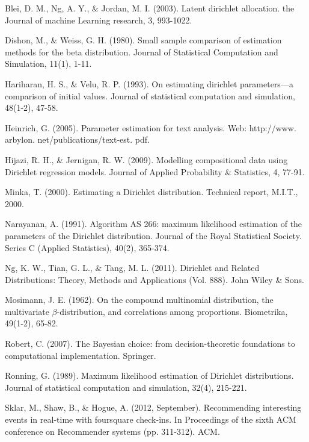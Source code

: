\documentclass[twoside]{article}
\begin{document}
\begin{thebibliography}{20}

Blei, D. M., Ng, A. Y., \& Jordan, M. I. (2003). Latent dirichlet allocation. the Journal of machine Learning research, 3, 993-1022.

Dishon, M., \& Weiss, G. H. (1980). Small sample comparison of estimation methods for the beta distribution. Journal of Statistical Computation and Simulation, 11(1), 1-11.

Hariharan, H. S., \& Velu, R. P. (1993). On estimating dirichlet parameters—a comparison of initial values. Journal of statistical computation and simulation, 48(1-2), 47-58.

Heinrich, G. (2005). Parameter estimation for text analysis. Web: http://www. arbylon. net/publications/text-est. pdf.

Hijazi, R. H., \& Jernigan, R. W. (2009). Modelling compositional data using Dirichlet regression models. Journal of Applied Probability \& Statistics, 4, 77-91.

Minka, T. (2000). Estimating a Dirichlet distribution. Technical report, M.I.T., 2000.

Narayanan, A. (1991). Algorithm AS 266: maximum likelihood estimation of the parameters of the Dirichlet distribution. Journal of the Royal Statistical Society. Series C (Applied Statistics), 40(2), 365-374.

Ng, K. W., Tian, G. L., \& Tang, M. L. (2011). Dirichlet and Related Distributions: Theory, Methods and Applications (Vol. 888). John Wiley \& Sons.

Mosimann, J. E. (1962). On the compound multinomial distribution, the multivariate \(\beta\)-distribution, and correlations among proportions. Biometrika, 49(1-2), 65-82.

Robert, C. (2007). The Bayesian choice: from decision-theoretic foundations to computational implementation. Springer.

Ronning, G. (1989). Maximum likelihood estimation of Dirichlet distributions. Journal of statistical computation and simulation, 32(4), 215-221.

Sklar, M., Shaw, B., \& Hogue, A. (2012, September). Recommending interesting events in real-time with foursquare check-ins. In Proceedings of the sixth ACM conference on Recommender systems (pp. 311-312). ACM.


\end{thebibliography}
\end{document}
